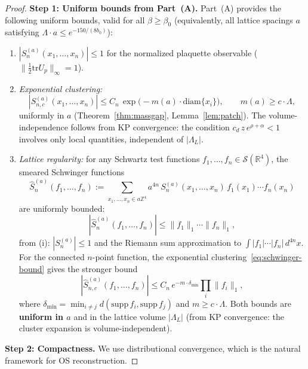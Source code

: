 \documentclass[11pt]{article}
\theoremstyle{definition}
\newcommand{\tr}{\mathrm{tr}}
\newcommand{\R}{\mathbb{R}}
\newcommand{\Z}{\mathbb{Z}}
\begin{document}
\begin{proof}
\textbf{Step 1: Uniform bounds from Part~(A).}
Part~(A) provides the following uniform bounds, valid for all
$\beta\ge\beta_0$ (equivalently, all lattice spacings $a$ satisfying
$\Lambda\cdot a\le e^{-150/(8b_0)}$):
\begin{enumerate}[nosep,label=(\roman*)]
\item $|S^{(a)}_n(x_1,\ldots,x_n)|\le 1$ for the normalized
plaquette observable ($\|\frac{1}{2}\tr U_p\|_\infty=1$).
\item \emph{Exponential clustering:}
\begin{equation}\label{eq:schwinger-bound}
|S^{(a)}_{n,c}(x_1,\ldots,x_n)|\le
C_n\,\exp\bigl(-m(a)\cdot\mathrm{diam}\{x_i\}\bigr),
\qquad m(a)\ge c\cdot\Lambda,
\end{equation}
uniformly in $a$ (Theorem~\ref{thm:massgap}, Lemma~\ref{lem:patch}).
The volume-independence follows from KP convergence:
the condition $c_d\,z\,e^{\rho+\alpha}<1$ involves only
local quantities, independent of $|\Lambda_L|$.
\item \emph{Lattice regularity:} for any Schwartz test functions
$f_1,\ldots,f_n\in\mathcal{S}(\R^4)$, the smeared Schwinger
functions
\begin{equation}\label{eq:smeared}
\hat S_n^{(a)}(f_1,\ldots,f_n)
:=\sum_{x_1,\ldots,x_n\in a\Z^4}a^{4n}\,
S_n^{(a)}(x_1,\ldots,x_n)\,f_1(x_1)\cdots f_n(x_n)
\end{equation}
are uniformly bounded:
\begin{equation}\label{eq:n-point-bound}
|\hat S_n^{(a)}(f_1,\ldots,f_n)|
\le\|f_1\|_1\cdots\|f_n\|_1,
\end{equation}
from (i): $|S_n^{(a)}|\le 1$ and the Riemann sum
approximation to $\int|f_1|\cdots|f_n|\,d^{4n}x$.
For the connected $n$-point function, the exponential
clustering~\eqref{eq:schwinger-bound} gives the
stronger bound
\begin{equation}\label{eq:n-point-connected}
|\hat S_{n,c}^{(a)}(f_1,\ldots,f_n)|
\le C_n\,e^{-m\cdot\delta_{\min}}
\prod_i\|f_i\|_1,
\end{equation}
where $\delta_{\min}=\min_{i\ne j}
d(\mathrm{supp}\,f_i,\mathrm{supp}\,f_j)$
and $m\ge c\cdot\Lambda$.
Both bounds are \textbf{uniform in $a$} and in the
lattice volume $|\Lambda_L|$ (from KP convergence:
the cluster expansion is volume-independent).
\end{enumerate}

\textbf{Step 2: Compactness.}
We use distributional convergence, which is the natural
framework for OS reconstruction.


\end{proof}
\end{document}
